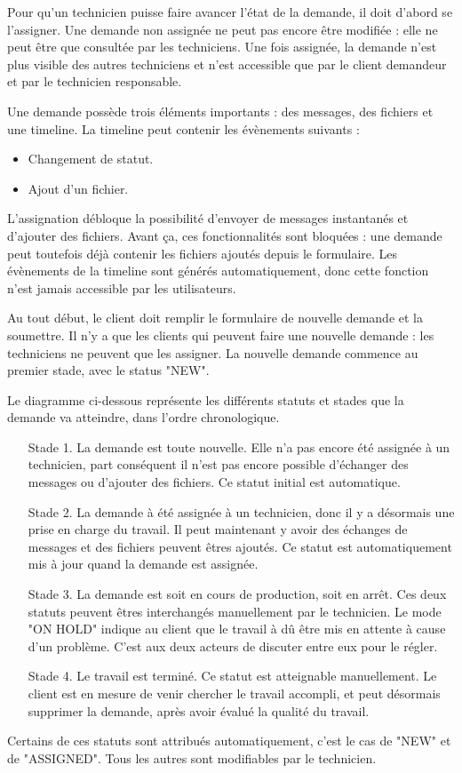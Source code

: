 \documentclass[
    iai, %
    eai, %
]{heig-tb}
\begin{document}
Pour qu'un technicien puisse faire avancer l'état de la demande, il doit d'abord se l'assigner.
Une demande non assignée ne peut pas encore être modifiée : elle ne peut être que consultée par les techniciens.
Une fois assignée, la demande n'est plus visible des autres techniciens et n'est accessible que par le client demandeur et par le technicien responsable.

Une demande possède trois éléments importants : des messages, des fichiers et une timeline.
La timeline peut contenir les évènements suivants :
\begin{itemize}
  \item Changement de statut.
  \item Ajout d'un fichier.
\end{itemize}
\bigskip

L'assignation débloque la possibilité d'envoyer de messages instantanés et d'ajouter des fichiers.
Avant ça, ces fonctionnalités sont bloquées : une demande peut toutefois déjà contenir les fichiers ajoutés depuis le formulaire.
Les évènements de la timeline sont générés automatiquement, donc cette fonction n'est jamais accessible par les utilisateurs.

Au tout début, le client doit remplir le formulaire de nouvelle demande et la soumettre.
Il n'y a que les clients qui peuvent faire une nouvelle demande : les techniciens ne peuvent que les assigner.
La nouvelle demande commence au premier stade, avec le status "NEW".
\newpage

Le diagramme ci-dessous représente les différents statuts et stades que la demande va atteindre, dans l'ordre chronologique.


\begin{enumerate}
  \item[Stade 1.] La demande est toute nouvelle. Elle n'a pas encore été assignée à un technicien, part conséquent il n'est pas encore possible d'échanger des messages ou d'ajouter des fichiers. Ce statut initial est automatique.
  \item[Stade 2.] La demande à été assignée à un technicien, donc il y a désormais une prise en charge du travail. Il peut maintenant y avoir des échanges de messages et des fichiers peuvent êtres ajoutés. Ce statut est automatiquement mis à jour quand la demande est assignée.
  \item[Stade 3.] La demande est soit en cours de production, soit en arrêt. Ces deux statuts peuvent êtres interchangés manuellement par le technicien. Le mode "ON HOLD" indique au client que le travail à dû être mis en attente à cause d'un problème. C'est aux deux acteurs de discuter entre eux pour le régler.
  \item[Stade 4.] Le travail est terminé. Ce statut est atteignable manuellement. Le client est en mesure de venir chercher le travail accompli, et peut désormais supprimer la demande, après avoir évalué la qualité du travail.
\end{enumerate}
\bigskip
Certains de ces statuts sont attribués automatiquement, c'est le cas de "NEW" et de "ASSIGNED".
Tous les autres sont modifiables par le technicien.
\end{document}
